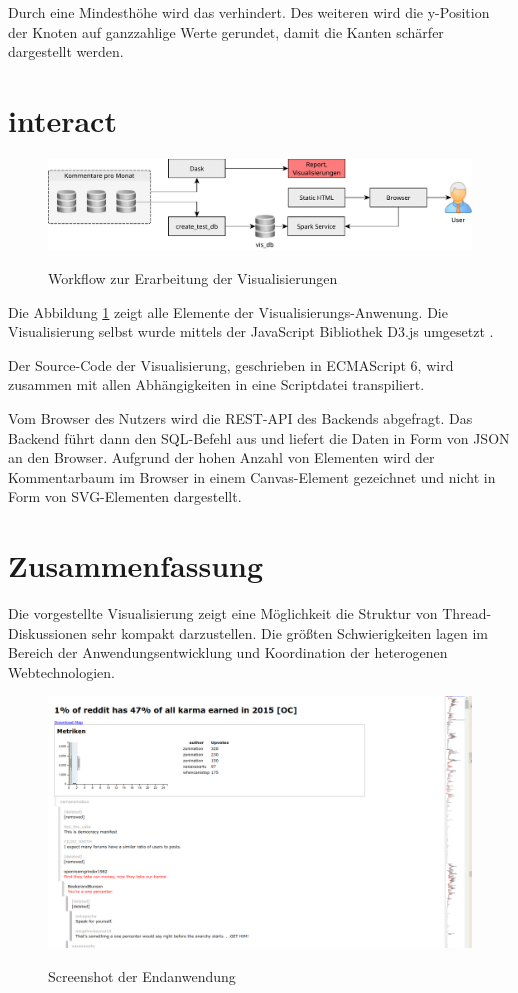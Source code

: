 \documentclass[nobib, nohyper, a4paper,openany]{tufte-book}
\begin{document}
Durch eine Mindesthöhe wird das verhindert. Des weiteren wird die y-Position der Knoten
auf ganzzahlige Werte gerundet, damit die Kanten schärfer dargestellt werden. 

\section{interact}
\begin{figure}
  \caption{ Workflow zur Erarbeitung der Visualisierungen }  
    \includegraphics[width=\textwidth]{figures/workflow.pdf} 
    \label{workflow}
\end{figure} 
Die Abbildung \ref{workflow} zeigt alle Elemente der Visualisierungs-Anwenung.
Die Visualisierung selbst wurde mittels der JavaScript Bibliothek D3.js umgesetzt \cite{BostockD3js2011}.

Der Source-Code der Visualisierung, geschrieben in ECMAScript 6,  
wird zusammen mit allen Abhängigkeiten in eine Scriptdatei transpiliert.
 
Vom Browser des Nutzers wird die REST-API des Backends abgefragt. 
Das Backend führt dann den SQL-Befehl aus und liefert die Daten in Form von JSON an den Browser.
Aufgrund der hohen Anzahl von Elementen wird der Kommentarbaum im Browser in einem Canvas-Element
gezeichnet und nicht in Form von SVG-Elementen dargestellt. 

\section{Zusammenfassung}
Die vorgestellte Visualisierung zeigt eine Möglichkeit die Struktur von Thread-Diskussionen sehr 
kompakt darzustellen. 
Die größten Schwierigkeiten lagen im Bereich der Anwendungsentwicklung und Koordination
der heterogenen Webtechnologien.  

\begin{figure}
  \caption{ Screenshot der Endanwendung}  
  \includegraphics[width=\textwidth]{figures/app_screen.png} 
  \label{screen}
\end{figure} 


\printbibliography
\end{document}
